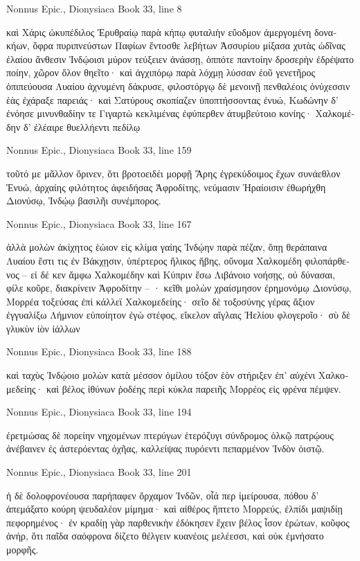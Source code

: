 \documentclass[12pt,letterpaper,twoside,final]{memoir}
\begin{document}
\begin{greek}
Nonnus Epic., Dionysiaca 
Book 33, line 8

καὶ Χάρις ὠκυπέδιλος Ἐρυθραίῳ παρὰ κήπῳ 
φυταλιὴν εὔοδμον ἀμεργομένη δονακήων, 
ὄφρα πυριπνεύστων Παφίων ἔντοσθε λεβήτων 
Ἀσσυρίου μίξασα χυτὰς ὠδῖνας ἐλαίου 
ἄνθεσιν Ἰνδῴοισι μύρον τεύξειεν ἀνάσσῃ, 
ὁππότε παντοίην δροσερὴν ἐδρέψατο ποίην, 
χῶρον ὅλον θηεῖτο· καὶ ἀγχιπόρῳ παρὰ λόχμῃ 
λύσσαν ἑοῦ γενετῆρος ὀπιπεύουσα Λυαίου 
ἀχνυμένη δάκρυσε, φιλοστόργῳ δὲ μενοινῇ 
πενθαλέοις ὀνύχεσσιν ἑὰς ἐχάραξε παρειάς· 
καὶ Σατύρους σκοπίαζεν ὑποπτήσσοντας ἐνυώ, 
Κωδώνην δ' ἐνόησε μινυνθαδίην τε Γιγαρτὼ 
κεκλιμένας ἐφύπερθεν ἀτυμβεύτοιο κονίης· 
Χαλκομέδην δ' ἐλέαιρε θυελλήεντι πεδίλῳ 




Nonnus Epic., Dionysiaca 
Book 33, line 159

τοῦτό με μᾶλλον ὄρινεν, ὅτι βροτοειδέι μορφῇ 
Ἄρης ἐγρεκύδοιμος ἔχων συνάεθλον Ἐνυώ, 
ἀρχαίης φιλότητος ἀφειδήσας Ἀφροδίτης, 
νεύμασιν Ἡραίοισιν ἐθωρήχθη Διονύσῳ, 
Ἰνδῴῳ βασιλῆι συνέμπορος. 



Nonnus Epic., Dionysiaca 
Book 33, line 167

ἀλλὰ μολὼν ἀκίχητος ἑώιον εἰς κλίμα γαίης 
Ἰνδῴην παρὰ πέζαν, ὅπῃ θεράπαινα Λυαίου 
ἔστι τις ἐν Βάκχῃσιν, ὑπέρτερος ἥλικος ἥβης, 
οὔνομα Χαλκομέδη φιλοπάρθενος – εἰ δέ κεν ἄμφω 
Χαλκομέδην καὶ Κύπριν ἔσω Λιβάνοιο νοήσῃς, 
οὐ δύνασαι, φίλε κοῦρε, διακρίνειν Ἀφροδίτην – · 
κεῖθι μολὼν χραίσμησον ἐρημονόμῳ Διονύσῳ, 
Μορρέα τοξεύσας ἐπὶ κάλλεϊ Χαλκομεδείης· 
σεῖο δὲ τοξοσύνης γέρας ἄξιον ἐγγυαλίξω   
Λήμνιον εὐποίητον ἐγὼ στέφος, εἴκελον αἴγλαις 
Ἠελίου φλογεροῖο· σὺ δὲ γλυκὺν ἰὸν ἰάλλων 




Nonnus Epic., Dionysiaca 
Book 33, line 188

καὶ ταχὺς Ἰνδῴοιο μολὼν κατὰ μέσσον ὁμίλου 
τόξον ἑὸν στήριξεν ἐπ' αὐχένι Χαλκομεδείης· 
καὶ βέλος ἰθύνων ῥοδέης περὶ κύκλα παρειῆς 
Μορρέος εἰς φρένα πέμψεν. 



Nonnus Epic., Dionysiaca 
Book 33, line 194

                               ἐρετμώσας δὲ πορείην 
νηχομένων πτερύγων ἑτερόζυγι σύνδρομος ὁλκῷ 
πατρῴους ἀνέβαινεν ἐς ἀστερόεντας ὀχῆας, 
καλλείψας πυρόεντι πεπαρμένον Ἰνδὸν ὀιστῷ. 



Nonnus Epic., Dionysiaca 
Book 33, line 201

ἡ δὲ δολοφρονέουσα παρήπαφεν ὄρχαμον Ἰνδῶν, 
οἷά περ ἱμείρουσα, πόθου δ' ἀπεμάξατο κούρη 
ψευδαλέον μίμημα· καὶ αἰθέρος ἥπτετο Μορρεύς, 
ἐλπίδι μαψιδίῃ πεφορημένος· ἐν κραδίῃ γὰρ 
παρθενικὴν ἐδόκησεν ἔχειν βέλος ἶσον ἐρώτων, 
κοῦφος ἀνήρ, ὅτι παῖδα σαόφρονα δίζετο θέλγειν 
κυανέοις μελέεσσι, καὶ οὐκ ἐμνήσατο μορφῆς. 




\end{greek}
\end{document}
